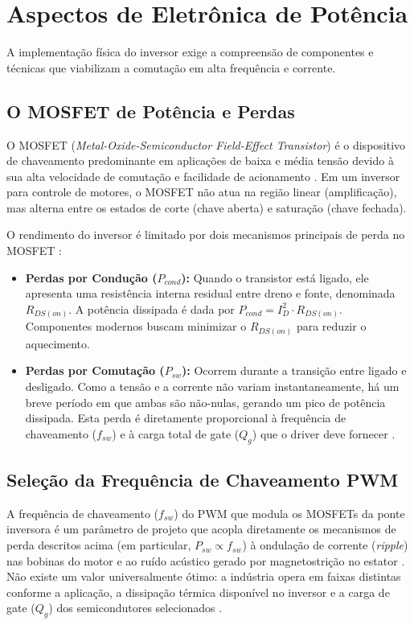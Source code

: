 \section{Aspectos de Eletrônica de Potência}

A implementação física do inversor exige a compreensão de componentes e técnicas que viabilizam a comutação em alta frequência e corrente.

\subsection{O MOSFET de Potência e Perdas}
O MOSFET (\textit{Metal-Oxide-Semiconductor Field-Effect Transistor}) é o dispositivo de chaveamento predominante em aplicações de baixa e média tensão devido à sua alta velocidade de comutação e facilidade de acionamento \cite{rashid2014power}. Em um inversor para controle de motores, o MOSFET não atua na região linear (amplificação), mas alterna entre os estados de corte (chave aberta) e saturação (chave fechada).

O rendimento do inversor é limitado por dois mecanismos principais de perda no MOSFET \cite{kim2017electric}:
\begin{itemize}
    \item \textbf{Perdas por Condução ($P_{cond}$):} Quando o transistor está ligado, ele apresenta uma resistência interna residual entre dreno e fonte, denominada $R_{DS(on)}$. A potência dissipada é dada por $P_{cond} = I_{D}^2 \cdot R_{DS(on)}$. Componentes modernos buscam minimizar o $R_{DS(on)}$ para reduzir o aquecimento.
    \item \textbf{Perdas por Comutação ($P_{sw}$):} Ocorrem durante a transição entre ligado e desligado. Como a tensão e a corrente não variam instantaneamente, há um breve período em que ambas são não-nulas, gerando um pico de potência dissipada. Esta perda é diretamente proporcional à frequência de chaveamento ($f_{sw}$) e à carga total de gate ($Q_g$) que o driver deve fornecer \cite{rashid2014power}.
\end{itemize}

\subsection{Seleção da Frequência de Chaveamento PWM}
\label{subsec:freq_chaveamento_pwm}

A frequência de chaveamento ($f_{sw}$) do PWM que modula os MOSFETs da ponte inversora é um parâmetro de projeto que acopla diretamente os mecanismos de perda descritos acima (em particular, $P_{sw} \propto f_{sw}$) à ondulação de corrente (\textit{ripple}) nas bobinas do motor e ao ruído acústico gerado por magnetostrição no estator \cite{mohan2003, hanselman2003brushless}. Não existe um valor universalmente ótimo: a indústria opera em faixas distintas conforme a aplicação, a dissipação térmica disponível no inversor e a carga de gate ($Q_g$) dos semicondutores selecionados \cite{rashid2014power}.

